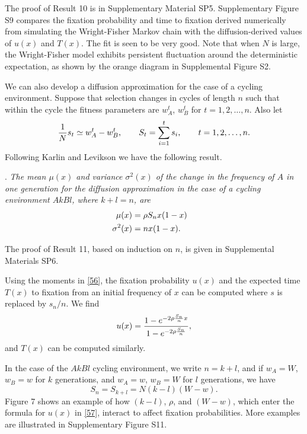 \documentclass[9pt,twocolumn,twoside,lineno]{pnas-new}
\newcommand{\an}[1]{\begin{align}#1\end{align}}
\begin{document}
 The proof of Result 10 is in Supplementary Material SP5.  
  Supplementary Figure S9 compares the fixation probability and time to fixation derived numerically from  simulating the Wright-Fisher Markov chain with the diffusion-derived values of $u(x)$ and $T(x)$. The fit is seen to be very good. Note that when $N$ is large, the Wright-Fisher model exhibits persistent fluctuation around the deterministic expectation, as shown by the orange diagram in Supplemental Figure S2.
 
 We can also develop a diffusion approximation for the case of a cycling environment. Suppose that selection changes in cycles of length $n$ such that within the cycle the fitness parameters are $w_A^t$, $w_B^t$ for $t=1,2,\dots,n$. Also let
 \begin{equation}
 {1\over N}s_t \simeq w_A^t -w_B^t,\qquad S_t =\sum_{i=1}^t s_i,\qquad t=1,2,\dots,n.
 \label{55}\end{equation}
 Following Karlin and Levikson \cite{karlin1974temporal} we have the following result.
 \medskip
 
 . {\sl The mean $\mu(x)$ and variance $\sigma^2(x)$ of the change in the frequency of $A$ in one generation for the diffusion approximation in the case of a cycling environment $AkBl$, where $k+l=n$, are
 \begin{equation}
 \an{
 \mu(x) &= \rho S_n x(1-x)\cr \sigma^2(x) &= nx(1-x).}
 \label{56}\end{equation}}
 
\noindent The proof of Result 11, based on induction on $n$, is given in Supplemental Materials SP6.
 
  
 Using the moments in \eqref{56}, the fixation probability $u(x)$ and the expected time $T(x)$ to fixation from an initial frequency of $x$ can be computed where $s$ is replaced by $s_n/n$. We find
 \begin{equation}
 u(x) ={1-e^{-2\rho{S_n\over n}x}\over 1-e^{-2\rho{S_n\over n}}},
\label{57} \end{equation}
 and $T(x)$ can be computed similarly.
 
 In the  case of the $AkBl$ cycling environment, we write $n=k+l$, and if $w_A=W$, $w_B=w$ for $k$ generations, and $w_A=w$, $w_B=W$ for $l$ generations, we have
 \begin{equation}
 S_n=S_{k+l} =N(k-l)(W-w).
 \label{58}\end{equation}
 Figure 7 shows an example of how $(k-l)$, $\rho$, and $(W-w)$, which enter the formula for $u(x)$ in \eqref{57}, interact to affect fixation probabilities. More examples are illustrated in Supplementary Figure S11.
\end{document}
